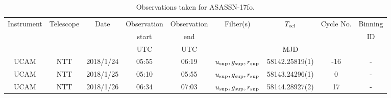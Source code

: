 \begin{table}
	\begin{center}
		\caption{Observations taken for ASASSN-17fo.}
		\label{table:observing:observation logs ASASSN-17fo}
		\begin{tabular}{ccccccccc}
			\hline
			Instrument & Telescope & Date & Observation  & Observation  & Filter(s) & $T_{\rm ecl}$ & Cycle No. & Binning \\
			 &  &  &  start &  end &  &  &  & ID \\
			 &  &  & UTC & UTC &  & MJD &  &  \\
			\hline
			\hline
			UCAM & NTT & 2018/1/24 & 05:55 & 06:19 & $u_{\rm sup},g_{\rm sup},r_{\rm sup}$ & 58142.25819(1) & -16 & - \\
			UCAM & NTT & 2018/1/25 & 05:10 & 05:55 & $u_{\rm sup},g_{\rm sup},r_{\rm sup}$ & 58143.24296(1) &   0 & - \\
			UCAM & NTT & 2018/1/26 & 06:34 & 07:03 & $u_{\rm sup},g_{\rm sup},r_{\rm sup}$ & 58144.28927(2) &  17 & - \\
		   \hline
		\end{tabular}
	\end{center}
\end{table}
